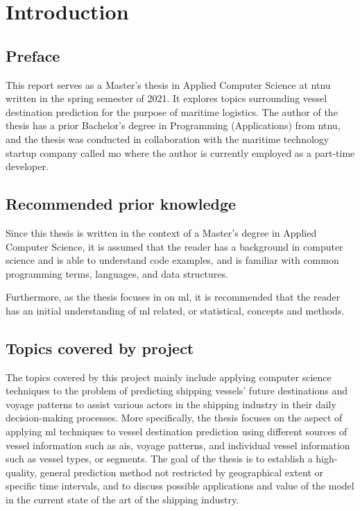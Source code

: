 \chapter{Introduction}

\section{Preface}

This report serves as a Master's thesis in Applied Computer Science at \acrfull{ntnu} written in the spring semester of 2021. It explores topics surrounding vessel destination prediction for the purpose of maritime logistics. The author of the thesis has a prior Bachelor’s degree in Programming (Applications) from \acrshort{ntnu}, and the thesis was conducted in collaboration with the maritime technology startup company called \acrfull{mo} where the author is currently employed as a part-time developer.

\section{Recommended prior knowledge}

Since this thesis is written in the context of a Master's degree in Applied Computer Science, it is assumed that the reader has a background in computer science and is able to understand code examples, and is familiar with common programming terms, languages, and data structures.

Furthermore, as the thesis focuses in on \acrfull{ml}, it is recommended that the reader has an initial understanding of \acrshort{ml} related, or statistical, concepts and methods.

\section{Topics covered by project}
\label{sec:topics_covered}

The topics covered by this project mainly include applying computer science techniques to the problem of predicting shipping vessels' future destinations and \gls{voyage} patterns to assist various actors in the shipping industry in their daily decision-making processes. More specifically, the thesis focuses on the aspect of applying \acrfull{ml} techniques to vessel destination prediction using different sources of vessel information such as \acrfull{ais}, \gls{voyage} patterns, and individual vessel information such as vessel types, or segments. The goal of the thesis is to establish a high-quality, general prediction method not restricted by geographical extent or specific time intervals, and to discuss possible applications and value of the model in the current state of the art of the shipping industry.

